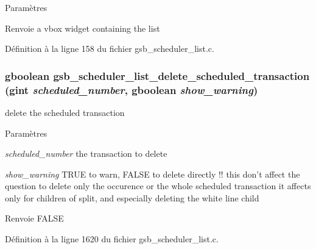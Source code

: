 \begin{DoxyParams}{Paramètres}
\item[{\em }]\end{DoxyParams}
\begin{DoxyReturn}{Renvoie}
a vbox widget containing the list 
\end{DoxyReturn}


Définition à la ligne 158 du fichier gsb\_\-scheduler\_\-list.c.

\subsubsection[{gsb\_\-scheduler\_\-list\_\-delete\_\-scheduled\_\-transaction}]{\setlength{\rightskip}{0pt plus 5cm}gboolean gsb\_\-scheduler\_\-list\_\-delete\_\-scheduled\_\-transaction (gint {\em scheduled\_\-number}, \/  gboolean {\em show\_\-warning})}\label{gsb__scheduler__list_8h_a250e1059f152f3bb43280745d0a66fe6}
delete the scheduled transaction


\begin{DoxyParams}{Paramètres}
\item[{\em scheduled\_\-number}]the transaction to delete \item[{\em show\_\-warning}]TRUE to warn, FALSE to delete directly !! this don't affect the question to delete only the occurence or the whole scheduled transaction it affects only for children of split, and especially deleting the white line child\end{DoxyParams}
\begin{DoxyReturn}{Renvoie}
FALSE 
\end{DoxyReturn}


Définition à la ligne 1620 du fichier gsb\_\-scheduler\_\-list.c.

